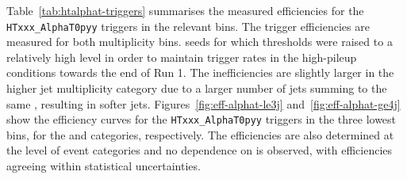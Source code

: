 Table~\ref{tab:htalphat-triggers} summarises the measured efficiencies
for the \verb!HTxxx_AlphaT0pyy! triggers in the relevant \scalht
bins. The trigger efficiencies are measured for both \njet
multiplicity bins. %
seeds for which thresholds were raised to a relatively high level in
order to maintain trigger rates in the high-pileup conditions towards
the end of Run 1. The inefficiencies are slightly larger in the higher
jet multiplicity category due to a larger number of jets summing to
the same \scalht, resulting in softer
jets. Figures~\ref{fig:eff-alphat-le3j} and~\ref{fig:eff-alphat-ge4j}
show the efficiency curves for the \verb!HTxxx_AlphaT0pyy! triggers in
the three lowest \scalht bins, for the \njetlow and \njethigh
categories, respectively. The efficiencies are also determined at the
level of event categories and no dependence on \nb is observed, with
efficiencies agreeing within statistical uncertainties.


